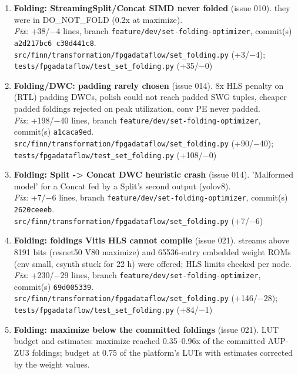 \documentclass[a4paper,10pt]{article}
\begin{document}
\begin{enumerate}
\emph{Fix:} +36/$-$2 lines, branch \texttt{feature/dev/set-folding-optimizer}, commit(s) \texttt{57594bf0c}.\\
{\footnotesize \texttt{src/finn/transformation/fpgadataflow/set\_folding.py} (+12/$-$2); \texttt{tests/fpgadataflow/test\_set\_folding.py} (+24/$-$0)}
\item \textbf{Folding: StreamingSplit/Concat SIMD never folded} (issue 010). they were in DO\_NOT\_FOLD (0.2x at maximize).\\
\emph{Fix:} +38/$-$4 lines, branch \texttt{feature/dev/set-folding-optimizer}, commit(s) \texttt{a2d217bc6 c38d441c8}.\\
{\footnotesize \texttt{src/finn/transformation/fpgadataflow/set\_folding.py} (+3/$-$4); \texttt{tests/fpgadataflow/test\_set\_folding.py} (+35/$-$0)}
\item \textbf{Folding/DWC: padding rarely chosen} (issue 014). 8x HLS penalty on (RTL) padding DWCs, polish could not reach padded SWG tuples, cheaper padded foldings rejected on peak utilization, conv PE never padded.\\
\emph{Fix:} +198/$-$40 lines, branch \texttt{feature/dev/set-folding-optimizer}, commit(s) \texttt{a1caca9ed}.\\
{\footnotesize \texttt{src/finn/transformation/fpgadataflow/set\_folding.py} (+90/$-$40); \texttt{tests/fpgadataflow/test\_set\_folding.py} (+108/$-$0)}
\item \textbf{Folding: Split -> Concat DWC heuristic crash} (issue 014). 'Malformed model' for a Concat fed by a Split's second output (yolov8).\\
\emph{Fix:} +7/$-$6 lines, branch \texttt{feature/dev/set-folding-optimizer}, commit(s) \texttt{2620ceeeb}.\\
{\footnotesize \texttt{src/finn/transformation/fpgadataflow/set\_folding.py} (+7/$-$6)}
\item \textbf{Folding: foldings Vitis HLS cannot compile} (issue 021). streams above 8191 bits (resnet50 V80 maximize) and 65536-entry embedded weight ROMs (cnv small, csynth stuck for 22 h) were offered; HLS limits checked per node.\\
\emph{Fix:} +230/$-$29 lines, branch \texttt{feature/dev/set-folding-optimizer}, commit(s) \texttt{69d005339}.\\
{\footnotesize \texttt{src/finn/transformation/fpgadataflow/set\_folding.py} (+146/$-$28); \texttt{tests/fpgadataflow/test\_set\_folding.py} (+84/$-$1)}
\item \textbf{Folding: maximize below the committed foldings} (issue 021). LUT budget and estimates: maximize reached 0.35--0.96x of the committed AUP-ZU3 foldings; budget at 0.75 of the platform's LUTs with estimates corrected by the weight values.\\

\end{enumerate}
\end{document}
